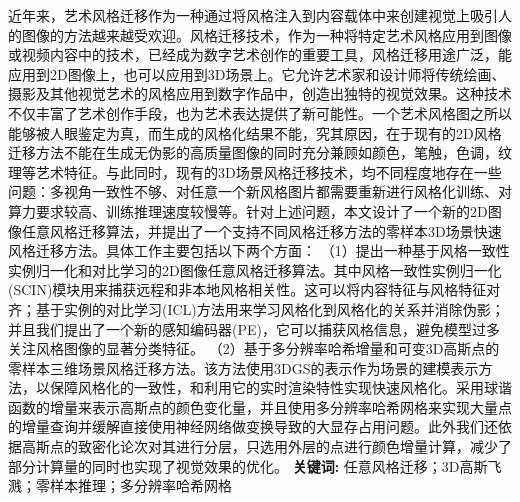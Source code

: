 \cleardoublepage
{}

\setlength{\parindent}{2em} 
近年来，艺术风格迁移作为一种通过将风格注入到内容载体中来创建视觉上吸引人的图像的方法越来越受欢迎。风格迁移技术，作为一种将特定艺术风格应用到图像或视频内容中的技术，已经成为数字艺术创作的重要工具，风格迁移用途广泛，能应用到2D图像上，也可以应用到3D场景上。它允许艺术家和设计师将传统绘画、摄影及其他视觉艺术的风格应用到数字作品中，创造出独特的视觉效果。这种技术不仅丰富了艺术创作手段，也为艺术表达提供了新可能性。一个艺术风格图之所以能够被人眼鉴定为真，而生成的风格化结果不能，究其原因，在于现有的2D风格迁移方法不能在生成无伪影的高质量图像的同时充分兼顾如颜色，笔触，色调，纹理等艺术特征。与此同时，现有的3D场景风格迁移技术，均不同程度地存在一些问题：多视角一致性不够、对任意一个新风格图片都需要重新进行风格化训练、对算力要求较高、训练推理速度较慢等。针对上述问题，本文设计了一个新的2D图像任意风格迁移算法，并提出了一个支持不同风格迁移方法的零样本3D场景快速风格迁移方法。具体工作主要包括以下两个方面：
\newline \indent（1）提出一种基于风格一致性实例归一化和对比学习的2D图像任意风格迁移算法。其中风格一致性实例归一化 (SCIN)模块用来捕获远程和非本地风格相关性。这可以将内容特征与风格特征对齐；基于实例的对比学习(ICL)方法用来学习风格化到风格化的关系并消除伪影；并且我们提出了一个新的感知编码器(PE)，它可以捕获风格信息，避免模型过多关注风格图像的显著分类特征。   
\newline \indent（2）基于多分辨率哈希增量和可变3D高斯点的零样本三维场景风格迁移方法。该方法使用3DGS的表示作为场景的建模表示方法，以保障风格化的一致性，和利用它的实时渲染特性实现快速风格化。采用球谐函数的增量来表示高斯点的颜色变化量，并且使用多分辨率哈希网格来实现大量点的增量查询并缓解直接使用神经网络做变换导致的大显存占用问题。此外我们还依据高斯点的致密化论次对其进行分层，只选用外层的点进行颜色增量计算，减少了部分计算量的同时也实现了视觉效果的优化。
\newline
{\textbf{关键词:}}
任意风格迁移；3D高斯飞溅；零样本推理；多分辨率哈希网格

